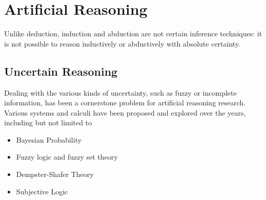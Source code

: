 \documentclass[thesis.tex]{subfiles}
\begin{document}
%
%


%
%











\section{Artificial Reasoning}






%
%



%
%





Unlike deduction, induction and abduction are not certain inference techniques: it is
not possible to reason inductively or abductively with absolute certainty.

\subsection{Uncertain Reasoning}

Dealing with the various kinds of uncertainty, such as fuzzy or incomplete information,
has been a cornerstone problem for artificial reasoning research. Various systems and
calculi have been proposed and explored over the years, including but not limited to

\begin{itemize}
  \item Bayesian Probability
  \item Fuzzy logic and fuzzy set theory
  \item Dempster-Shafer Theory
  \item Subjective Logic
\end{itemize}
\end{document}
